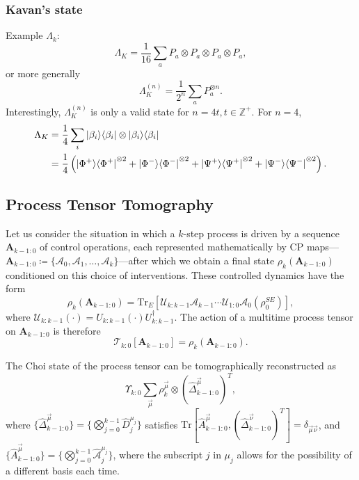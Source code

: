\documentclass{article}
\begin{document}
\subsubsection{Kavan's state}
Example $\Lambda_k$:
\begin{equation}
    \Lambda_K = \frac{1}{16}\sum_a P_a \otimes P_a \otimes P_a \otimes P_a,
\end{equation}
or more generally
\begin{equation}
    \Lambda_K^{(n)}  = \frac{1}{2^n}\sum_a P_a^{\otimes n}.
\end{equation}
Interestingly, $\Lambda_K^{(n)}$ is only a valid state for $n = 4t, t\in \mathbb{Z^+}$. For $n=4$,
\begin{equation}
    \begin{split}
        \Lambda_K &= \frac{1}{4}\sum_i\ket{\beta_i}\!\bra{\beta_i}\otimes \ket{\beta_i}\!\bra{\beta_i} \\
        &= \frac{1}{4} \left(\ket{\Phi^+}\!\bra{\Phi^+}^{\otimes 2} + \ket{\Phi^-}\!\bra{\Phi^-}^{\otimes 2} + \ket{\Psi^+}\!\bra{\Psi^+}^{\otimes 2} + \ket{\Psi^-}\!\bra{\Psi^-}^{\otimes 2}\right).
    \end{split}
\end{equation}

\subsection{Process Tensor Tomography}
Let us consider the situation in which
a $k$-step process is driven by a sequence $\mathbf{A}_{k-1:0}$ of control operations, each represented mathematically by CP maps—$\mathbf{A}_{k-1:0} \coloneqq \{\mathcal{A}_0, \mathcal{A}_1,\dots, \mathcal{A}_k\}$—after which we obtain a final state $\rho_k(\mathbf{A}_{k-1:0})$ conditioned on this choice of interventions. These controlled dynamics have the form
$$
\rho_k(\mathbf{A}_{k-1:0}) = \text{Tr}_E[\mathcal{U}_{k:k-1}\mathcal{A}_{k-1}\cdots \mathcal{U}_{1:0}\mathcal{A}_0(\rho_0^{SE})],
$$
where $\mathcal{U}_{k:k-1}(\cdot) = U_{k:k-1}(\cdot)U_{k:k-1}^\dagger$. The action of a multitime process tensor on $\mathbf{A}_{k-1:0}$ is therefore
$$
\mathcal{T}_{k:0}[\mathbf{A}_{k-1:0}] = \rho_k(\mathbf{A}_{k-1:0}).
$$

The Choi state of the process tensor can be tomographically reconstructed as
$$
\Upsilon_{k:0} \sum_{\vec{\mu}}\rho_k^{\vec{\mu}} \otimes (\hat{\Delta}_{k-1:0}^{\vec{\mu}})^T,
$$
where $\{\hat{\Delta}_{k-1:0}^{\vec{\mu}}\} = \{\bigotimes_{j=0}^{k-1}\hat{D}_j^{\mu_j}\}$ satisfies $\text{Tr}[\hat{A}^{\vec{\mu}}_{k-1:0}, (\hat{\Delta}_{k-1:0}^{\vec{\nu}})^T]=\delta_{\vec{\mu}\vec{\nu}}$, and $\{\hat{A}^{\vec{\mu}}_{k-1:0}\}=\{\bigotimes_{j=0}^{k-1}\hat{\mathcal{A}}_j^{\mu_j}\}$, where the subscript $j$ in $\mu_j$ allows for the possibility of a different basis each time.
\end{document}
